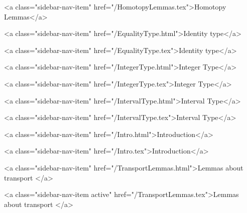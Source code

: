       
        
          <a class="sidebar-nav-item" href="/HomotopyLemmas.tex">Homotopy Lemmas</a>
        
      
    
      
        
          <a class="sidebar-nav-item" href="/EqualityType.html">Identity type</a>
        
      
    
      
        
          <a class="sidebar-nav-item" href="/EqualityType.tex">Identity type</a>
        
      
    
      
        
          <a class="sidebar-nav-item" href="/IntegerType.html">Integer Type</a>
        
      
    
      
        
          <a class="sidebar-nav-item" href="/IntegerType.tex">Integer Type</a>
        
      
    
      
        
          <a class="sidebar-nav-item" href="/IntervalType.html">Interval Type</a>
        
      
    
      
        
          <a class="sidebar-nav-item" href="/IntervalType.tex">Interval Type</a>
        
      
    
      
        
          <a class="sidebar-nav-item" href="/Intro.html">Introduction</a>
        
      
    
      
        
          <a class="sidebar-nav-item" href="/Intro.tex">Introduction</a>
        
      
    
      
        
          <a class="sidebar-nav-item" href="/TransportLemmas.html">Lemmas about transport </a>
        
      
    
      
        
          <a class="sidebar-nav-item active" href="/TransportLemmas.tex">Lemmas about transport </a>
        
      
    
